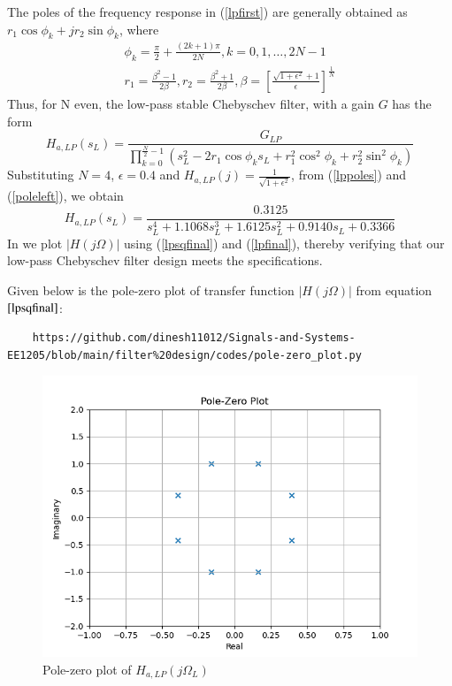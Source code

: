 \documentclass{article}
\begin{document}
\begin{enumerate}
The poles of the frequency response in (\ref{lpfirst}) are generally obtained as 
$r_1\cos\phi_k + jr_2\sin \phi_k$, where
\begin{eqnarray}
\label{lppoles}
\phi_k = \frac{\pi}{2} + \frac{(2k+1)\pi}{2N}, k = 0, 1, \dots, 2N-1 \nonumber \\
r_1 = \frac{\beta^2 - 1}{2\beta}, r_2 = \frac{\beta^2 + 1}{2\beta}, \beta = \left[ \frac{\sqrt{1 + \epsilon^2} + 1}{\epsilon}\right]^{\frac{1}{N}}
\end{eqnarray}
Thus, for N even, the low-pass stable Chebyschev filter, with a gain $G$ has the form
\begin{equation}
\label{poleleft}
H_{a,LP}(s_L) = \frac{G_{LP}}{\prod_{k = 0}^{\frac{N}{2}-1}(s_L^2 - 2r_1\cos\phi_ks_L + r_1^2\cos^2\phi_k + r_2^2 \sin^2\phi_k)}
\end{equation}
Substituting $N = 4$, $\epsilon = 0.4$ and $H_{a,LP}(j) = \frac{1}{\sqrt{1+\epsilon^2}}$, from (\ref{lppoles}) and (\ref{poleleft}), we obtain 
\begin{equation}
\label{lpfinal}
H_{a,LP}(s_L) = \frac{0.3125}{s_L^4 + 1.1068s_L^3 + 1.6125s_L^2+0.9140s_L + 0.3366}
\end{equation}
In  we plot $|H(j\Omega)|$ using (\ref{lpsqfinal}) and (\ref{lpfinal}), thereby verifying that our low-pass Chebyschev filter design meets the specifications.

Given below is the pole-zero plot of transfer function $|H(j\Omega)|$ from equation$\eqref{lpsqfinal}$:
\begin{lstlisting}
	https://github.com/dinesh11012/Signals-and-Systems-EE1205/blob/main/filter%20design/codes/pole-zero_plot.py
\end{lstlisting}

\begin{figure}[H]
\includegraphics[width = \columnwidth]{figs/pole_zero.png}
\caption{Pole-zero plot of $H_{a,LP}(j\Omega_L)$}
\label{fig1}
\end{figure}


\end{enumerate}
\end{document}
